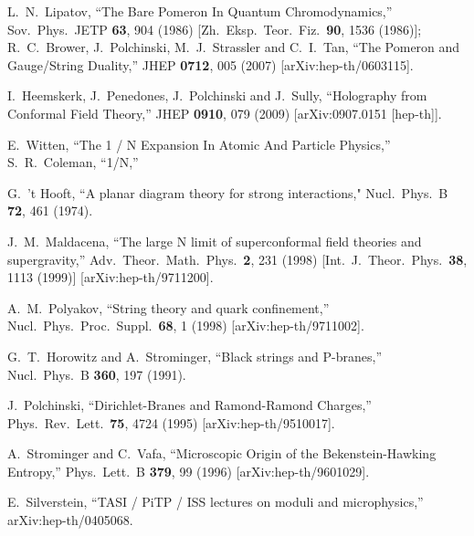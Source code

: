 \documentclass[12pt]{article}
\begin{document}
{\begin{thebibliography}{99}
  L.~N.~Lipatov,
  ``The Bare Pomeron In Quantum Chromodynamics,''
  Sov.\ Phys.\ JETP {\bf 63}, 904 (1986)
  [Zh.\ Eksp.\ Teor.\ Fiz.\  {\bf 90}, 1536 (1986)];\\
R.~C.~Brower, J.~Polchinski, M.~J.~Strassler and C.~I.~Tan,
  ``The Pomeron and Gauge/String Duality,''
  JHEP {\bf 0712}, 005 (2007)
  [arXiv:hep-th/0603115].
  
  I.~Heemskerk, J.~Penedones, J.~Polchinski and J.~Sully,
  ``Holography from Conformal Field Theory,''
  JHEP {\bf 0910}, 079 (2009)
  [arXiv:0907.0151 [hep-th]].

  E.~Witten,
  ``The 1 / N Expansion In Atomic And Particle Physics,''
  S.~R.~Coleman,
  ``1/N,''
  
  G.~'t Hooft,
  ``A planar diagram theory for strong interactions,"
  Nucl.\ Phys.\  B {\bf 72}, 461 (1974).
  
  J.~M.~Maldacena,
  ``The large N limit of superconformal field theories and supergravity,''
  Adv.\ Theor.\ Math.\ Phys.\  {\bf 2}, 231 (1998)
  [Int.\ J.\ Theor.\ Phys.\  {\bf 38}, 1113 (1999)]
  [arXiv:hep-th/9711200].
  
  A.~M.~Polyakov,
  ``String theory and quark confinement,''
  Nucl.\ Phys.\ Proc.\ Suppl.\  {\bf 68}, 1 (1998)
  [arXiv:hep-th/9711002].
  
  G.~T.~Horowitz and A.~Strominger,
  ``Black strings and P-branes,''
  Nucl.\ Phys.\  B {\bf 360}, 197 (1991).

  J.~Polchinski,
  ``Dirichlet-Branes and Ramond-Ramond Charges,''
  Phys.\ Rev.\ Lett.\  {\bf 75}, 4724 (1995)
  [arXiv:hep-th/9510017].
  
  A.~Strominger and C.~Vafa,
  ``Microscopic Origin of the Bekenstein-Hawking Entropy,''
  Phys.\ Lett.\  B {\bf 379}, 99 (1996)
  [arXiv:hep-th/9601029].

  E.~Silverstein,
  ``TASI / PiTP / ISS lectures on moduli and microphysics,''
  arXiv:hep-th/0405068.
  

\end{thebibliography}}
\end{document}

